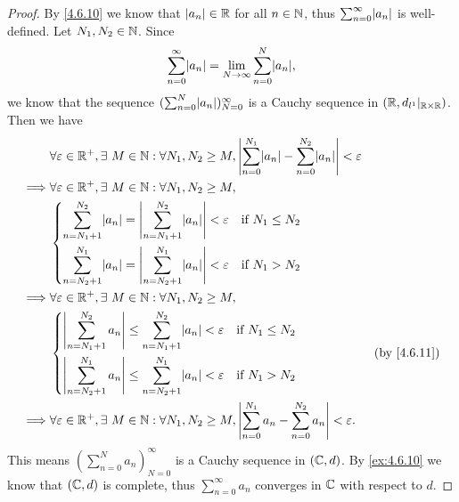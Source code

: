 \begin{proof}
  By \cref{4.6.10} we know that \(\left\lvert a_n\right\rvert \in \mathbb{R}\) for all \(n \in \mathbb{N}\), thus \(\sum_{n = 0}^\infty \abs{a_n}\) is well-defined.
  Let \(N_1, N_2 \in \mathbb{N}\).
  Since
  \[
    \sum_{n = 0}^\infty \abs{a_n} = \lim_{N \to \infty} \sum_{n = 0}^N \abs{a_n},
  \]
  we know that the sequence \((\sum_{n = 0}^N \abs{a_n})_{N = 0}^\infty\) is a Cauchy sequence in \((\mathbb{R}, d_{l^1}|_{\mathbb{R} \times \mathbb{R}})\).
  Then we have
  \begin{align*}
             & \forall \varepsilon \in \R^+, \exists\ M \in \N : \forall N_1, N_2 \geq M, \abs{\sum_{n = 0}^{N_1} \abs{a_n} - \sum_{n = 0}^{N_2} \abs{a_n}} < \varepsilon \\
    \implies & \forall \varepsilon \in \R^+, \exists\ M \in \N : \forall N_1, N_2 \geq M,                                                                                 \\
             & \begin{dcases}
                 \sum_{n = N_1 + 1}^{N_2} \abs{a_n} = \abs{\sum_{n = N_1 + 1}^{N_2} \abs{a_n}} < \varepsilon & \text{if } N_1 \leq N_2 \\
                 \sum_{n = N_2 + 1}^{N_1} \abs{a_n} = \abs{\sum_{n = N_2 + 1}^{N_1} \abs{a_n}} < \varepsilon & \text{if } N_1 > N_2
               \end{dcases}                       \\
    \implies & \forall \varepsilon \in \R^+, \exists\ M \in \N : \forall N_1, N_2 \geq M,                                                                                 \\
             & \begin{dcases}
                 \abs{\sum_{n = N_1 + 1}^{N_2} a_n} \leq \sum_{n = N_1 + 1}^{N_2} \abs{a_n} < \varepsilon & \text{if } N_1 \leq N_2 \\
                 \abs{\sum_{n = N_2 + 1}^{N_1} a_n} \leq \sum_{n = N_2 + 1}^{N_1} \abs{a_n} < \varepsilon & \text{if } N_1 > N_2
               \end{dcases}                                      &  & \text{(by \cref{4.6.11})}                                         \\
    \implies & \forall \varepsilon \in \R^+, \exists\ M \in \N : \forall N_1, N_2 \geq M, \abs{\sum_{n = 0}^{N_1} a_n - \sum_{n = 0}^{N_2} a_n} < \varepsilon.
  \end{align*}
  This means \((\sum_{n = 0}^N a_n)_{N = 0}^\infty\) is a Cauchy sequence in \((\mathbb{C}, d)\).
  By \cref{ex:4.6.10} we know that \((\mathbb{C}, d)\) is complete, thus \(\sum_{n = 0}^\infty a_n\) converges in \(\mathbb{C}\) with respect to \(d\).
\end{proof}

